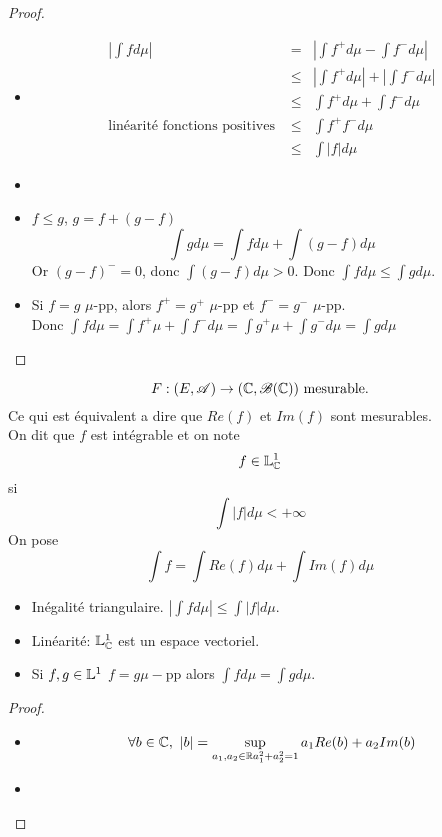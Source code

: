 \begin{proof}
	\begin{itemize}
		\item  \begin{eqnarray*}
			      |\int f d\mu| &=& \left|\int f^+ d\mu - \int f^- d\mu \right| \\
			      &\leq& \left|\int f^+ d\mu \right| + \left|\int f^- d\mu \right| \\
			      &\leq& \int f^+ d\mu + \int f^- d\mu  \\
			      \text{linéarité fonctions positives } &\leq& \int f^+ f^- d\mu  \\
			      &\leq& \int |f| d\mu
		      \end{eqnarray*}
		\item %
		\item $f \leq g$, $g = f + (g-f)$
		      $$\int g d\mu = \int f d\mu + \int (g-f) d \mu$$
		      Or $(g-f)^- = 0$, donc $\int (g-f) d\mu > 0$.
		      Donc $\int f d\mu \leq \int g d\mu$.
		\item Si $f = g$ $\mu$-pp, alors $f^+ = g^+$ $\mu$-pp et $f^- = g^-$ $\mu$-pp.\\
		      Donc $\int f d\mu = \int f^+ \mu + \int f^-  d\mu = \int g^+ \mu + \int g^-  d\mu = \int g d\mu$
	\end{itemize}
\end{proof}

\begin{definition}
	$$ F: (E, \mathscr{A}) \to (\mathbb{C}, \mathscr{B}(\mathbb{C})) \text{ mesurable.}$$
	Ce qui est équivalent a dire que $Re(f)$ et $Im(f)$ sont mesurables.\\
	On dit que $f$ est intégrable et on note
	$$ f\in \mathbb{L}^1_{\mathbb{C}}$$
	si $$\int |f| d\mu < +\infty$$
	On pose
	$$ \int f = \int Re(f) d\mu + \int Im(f) d\mu $$
\end{definition}


\begin{prop}
	\begin{itemize}
		\item Inégalité triangulaire. $\left| \int f d\mu \right| \leq \int |f| d \mu$.
		\item Linéarité: $\mathbb{L}^1_{\mathbb{C}}$ est un espace vectoriel.
		\item Si $f,g \in \mathbb{L}^1$ $f = g \mu-$pp alors $\int f d\mu = \int g d\mu$.
	\end{itemize}
\end{prop}


\begin{proof}
	\begin{itemize}
		\item $$\forall b \in \mathbb{C}, \ |b| = \sup_{a_1, a_2 \in \mathbb{R} \\ a_1^2 + a_2^2 = 1 } a_1 Re(b) + a_2 Im(b)$$
		\item
	\end{itemize}
\end{proof}



